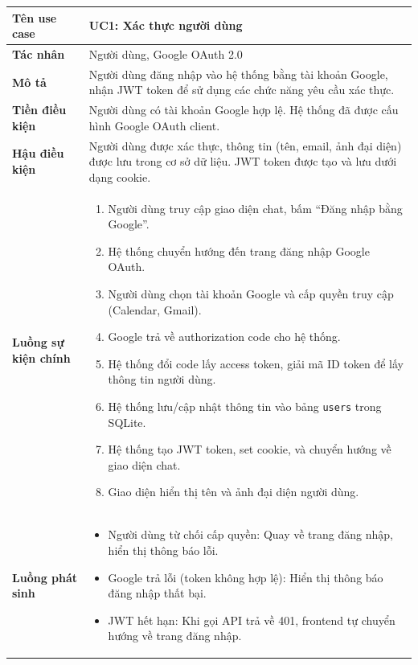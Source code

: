 \documentclass[../DoAn.tex]{subfiles}
\begin{document}
\begin{table}[H]
\centering
\small
\begin{tabular}{|p{3.5cm}|p{10cm}|}
\hline
\textbf{Tên use case} & UC1: Xác thực người dùng \\
\hline
\textbf{Tác nhân} & Người dùng, Google OAuth 2.0 \\
\hline
\textbf{Mô tả} & Người dùng đăng nhập vào hệ thống bằng tài khoản Google, nhận JWT token để sử dụng các chức năng yêu cầu xác thực. \\
\hline
\textbf{Tiền điều kiện} & Người dùng có tài khoản Google hợp lệ. Hệ thống đã được cấu hình Google OAuth client. \\
\hline
\textbf{Hậu điều kiện} & Người dùng được xác thực, thông tin (tên, email, ảnh đại diện) được lưu trong cơ sở dữ liệu. JWT token được tạo và lưu dưới dạng cookie. \\
\hline
\textbf{Luồng sự kiện chính} &
\begin{enumerate}
    \item Người dùng truy cập giao diện chat, bấm ``Đăng nhập bằng Google''.
    \item Hệ thống chuyển hướng đến trang đăng nhập Google OAuth.
    \item Người dùng chọn tài khoản Google và cấp quyền truy cập (Calendar, Gmail).
    \item Google trả về authorization code cho hệ thống.
    \item Hệ thống đổi code lấy access token, giải mã ID token để lấy thông tin người dùng.
    \item Hệ thống lưu/cập nhật thông tin vào bảng \texttt{users} trong SQLite.
    \item Hệ thống tạo JWT token, set cookie, và chuyển hướng về giao diện chat.
    \item Giao diện hiển thị tên và ảnh đại diện người dùng.
\end{enumerate} \\
\hline
\textbf{Luồng phát sinh} &
\begin{itemize}
    \item[3a.] Người dùng từ chối cấp quyền: Quay về trang đăng nhập, hiển thị thông báo lỗi.
    \item[5a.] Google trả lỗi (token không hợp lệ): Hiển thị thông báo đăng nhập thất bại.
    \item[*] JWT hết hạn: Khi gọi API trả về 401, frontend tự chuyển hướng về trang đăng nhập.
\end{itemize} \\
\hline
\end{tabular}
\end{table}
\end{document}
